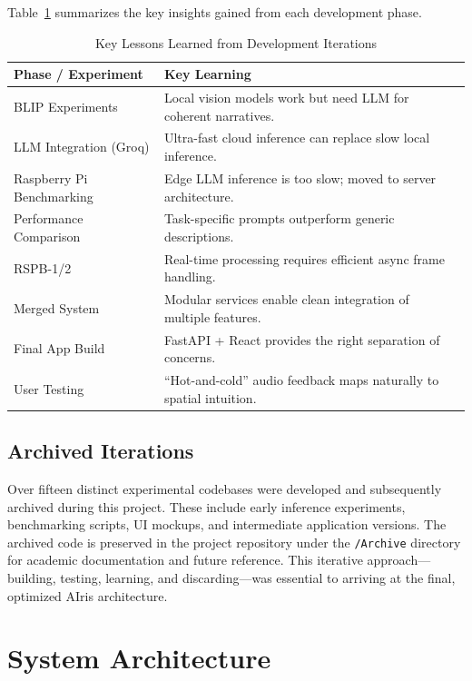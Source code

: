 \documentclass[12pt,a4paper]{report}
\begin{document}
Table~\ref{tab:lessons_learned} summarizes the key insights gained from each development phase.

\begin{table}[H]
\centering
\caption{Key Lessons Learned from Development Iterations}
\label{tab:lessons_learned}
\begin{tabular}{@{}ll@{}}
\toprule
\textbf{Phase / Experiment} & \textbf{Key Learning} \\ \midrule
BLIP Experiments & Local vision models work but need LLM for coherent narratives. \\
LLM Integration (Groq) & Ultra-fast cloud inference can replace slow local inference. \\
Raspberry Pi Benchmarking & Edge LLM inference is too slow; moved to server architecture. \\
Performance Comparison & Task-specific prompts outperform generic descriptions. \\
RSPB-1/2 & Real-time processing requires efficient async frame handling. \\
Merged System & Modular services enable clean integration of multiple features. \\
Final App Build & FastAPI + React provides the right separation of concerns. \\
User Testing & ``Hot-and-cold'' audio feedback maps naturally to spatial intuition. \\ \bottomrule
\end{tabular}
\end{table}

\section{Archived Iterations}

Over fifteen distinct experimental codebases were developed and subsequently archived during this project. These include early inference experiments, benchmarking scripts, UI mockups, and intermediate application versions. The archived code is preserved in the project repository under the \texttt{/Archive} directory for academic documentation and future reference. This iterative approach—building, testing, learning, and discarding—was essential to arriving at the final, optimized AIris architecture.


\chapter{System Architecture}
\end{document}
